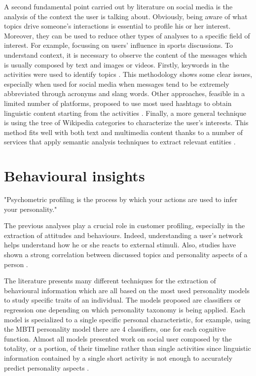 A second fundamental point carried out by literature on social media is the analysis of the context the user is talking about.
Obviously, being aware of what topics drive someone's interactions is essential to profile his or her interest. 
Moreover, they can be used to reduce other types of analyses to a specific field of interest. For example, focussing on users' influence in sports discussions.
To understand context, it is necessary to observe the content of the messages which is usually composed by text and images or videos.
Firstly, keywords in the activities were used to identify topics \cite{cha2010measuring}. This methodology shows some clear issues, especially when used for social media when messages tend to be extremely abbreviated through acronyms and slang words.
Other approaches, feasible in a limited number of platforms, proposed to use most used hashtags to obtain linguistic content starting from the activities \cite{pennacchiotti2011machine}.
Finally, a more general technique is using the tree of Wikipedia categories to characterize the user's interests. 
This method fits well with both text and multimedia content thanks to a number of services that apply semantic analysis techniques to extract relevant entities \cite{torrero2018wikipedia}. 

\section{Behavioural insights}
"Psychometric profiling is the process by which your actions are used to infer your personality."

The previous analyses play a crucial role in customer profiling, especially in the extraction of attitudes and behaviours.
Indeed, understanding a user's network helps understand how he or she reacts to external stimuli. Also, studies have shown a strong correlation between discussed topics and personality aspects of a person \cite{kern2016gaining}.

The literature presents many different techniques for the extraction of behavioural information which are all based on the most used personality models to study specific traits of an individual.
The models proposed are classifiers or regression one depending on which personality taxonomy is being applied.
Each model is specialized to a single specific personal characteristic, for example, using the MBTI personality model there are 4 classifiers, one for each cognitive function.
Almost all models presented work on social user composed by the totality, or a portion, of their timeline rather than single activities since linguistic information contained by a single short activity is not enough to accurately predict personality aspects \cite{mairesse2007using}.

